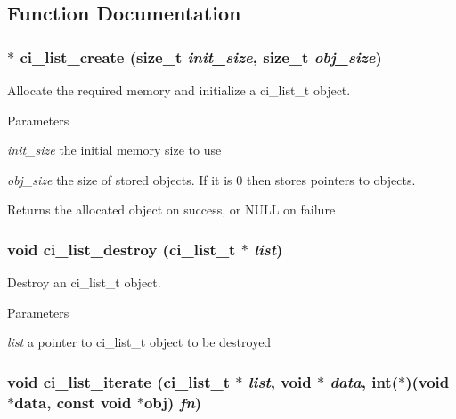 \subsection{Function Documentation}
\hypertarget{group__LISTS_gaad0298a6a8b8b941153be59c99953581}{
\subsubsection[{ci\_\-list\_\-create}]{$\ast$ ci\_\-list\_\-create (size\_\-t {\em init\_\-size}, \/  size\_\-t {\em obj\_\-size})}}
\label{group__LISTS_gaad0298a6a8b8b941153be59c99953581}


Allocate the required memory and initialize a ci\_\-list\_\-t object. 
\begin{DoxyParams}{Parameters}
\item[{\em init\_\-size}]the initial memory size to use \item[{\em obj\_\-size}]the size of stored objects. If it is 0 then stores pointers to objects. \end{DoxyParams}
\begin{DoxyReturn}{Returns}
the allocated object on success, or NULL on failure 
\end{DoxyReturn}
\hypertarget{group__LISTS_gaa6f56c0149c919fa0c324c8dbff28d86}{
\subsubsection[{ci\_\-list\_\-destroy}]{\setlength{\rightskip}{0pt plus 5cm}void ci\_\-list\_\-destroy ({\bf ci\_\-list\_\-t} $\ast$ {\em list})}}
\label{group__LISTS_gaa6f56c0149c919fa0c324c8dbff28d86}


Destroy an ci\_\-list\_\-t object. 
\begin{DoxyParams}{Parameters}
\item[{\em list}]a pointer to ci\_\-list\_\-t object to be destroyed \end{DoxyParams}
\hypertarget{group__LISTS_ga41e1711d5e7f24c8f1df51173293f668}{
\subsubsection[{ci\_\-list\_\-iterate}]{\setlength{\rightskip}{0pt plus 5cm}void ci\_\-list\_\-iterate ({\bf ci\_\-list\_\-t} $\ast$ {\em list}, \/  void $\ast$ {\em data}, \/  int($\ast$)(void $\ast$data, const void $\ast$obj) {\em fn})}}
\label{group__LISTS_ga41e1711d5e7f24c8f1df51173293f668}


